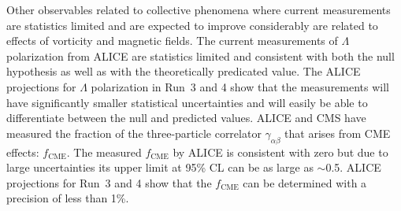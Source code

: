 Other observables related to collective phenomena where current 
  measurements are statistics limited and are expected to improve 
  considerably are related to effects of vorticity and magnetic fields.
%
The current measurements of $\Lambda$ polarization from ALICE are statistics limited
  and consistent with both the null hypothesis as well as with the theoretically
  predicated value.
The ALICE projections for $\Lambda$ polarization in Run~3 and 4 show that 
  the measurements will have significantly smaller statistical uncertainties 
  and will easily be able to differentiate between the null and predicted values. 
%
ALICE and CMS have measured the fraction of the three-particle correlator
  $\gamma_{\alpha\beta}$ that arises from CME effects: $f_{\mathrm{CME}}$.
The measured $f_{\mathrm{CME}}$ by ALICE is consistent with zero but due to 
  large uncertainties its upper limit at 95\% CL can be as large as $\sim$0.5.
ALICE projections for Run~3 and 4 show that the $f_{\mathrm{CME}}$ can 
  be determined with a precision of less than 1\%.


















